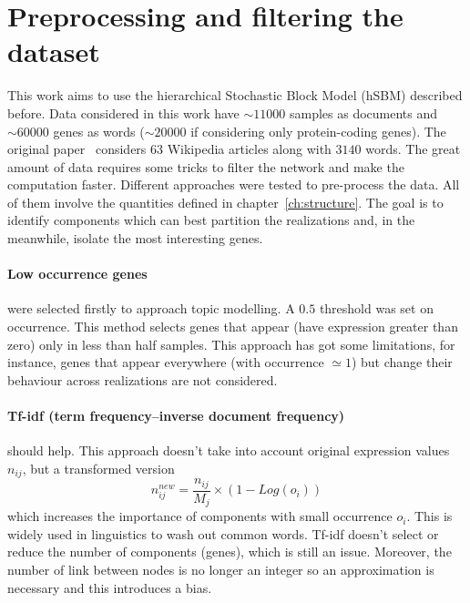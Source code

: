 \section{Preprocessing and filtering the dataset}
This work aims to use the hierarchical Stochastic Block Model (hSBM) described before. Data considered in this work have $\sim 11000$ samples as documents and $\sim 60000$ genes as words ($\sim 20000$ if considering only protein-coding genes). The original paper~\cite{gerlach2018network} considers $63$ Wikipedia articles along with $3140$ words. The great amount of data requires some tricks to filter the network and make the computation faster.
Different approaches were tested to pre-process the data. All of them involve the quantities defined in chapter~\ref{ch:structure}. The goal is to identify components which can best partition the realizations and, in the meanwhile, isolate the most interesting genes.
 
\paragraph{Low occurrence genes} were selected firstly to approach topic modelling. A $0.5$ threshold was set on occurrence. This method selects genes that appear (have expression greater than zero) only in less than half samples. This approach has got some limitations, for instance, genes that appear everywhere (with occurrence $\simeq 1$) but change their behaviour across realizations are not considered.

\paragraph{Tf-idf (term frequency–inverse document frequency)} should help. This approach doesn't take into account original expression values $n_{ij}$, but a transformed version
\[
n^{new}_{ij}=\frac{n_{i j}}{M_j}\times \left(1-Log\left(o_i\right)\right)
\] which increases the importance of components with small occurrence $o_i$. This is widely used in linguistics to wash out common words. Tf-idf doesn't select or reduce the number of components (genes), which is still an issue. Moreover, the number of link between nodes is no longer an integer so an approximation is necessary and this introduces a bias.

